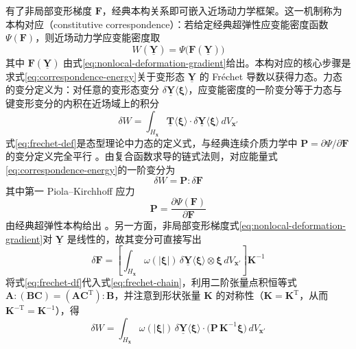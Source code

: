 有了非局部变形梯度 $\mathbf{F}$，经典本构关系即可嵌入近场动力学框架。这一机制称为本构对应（constitutive correspondence）：若给定经典超弹性应变能密度函数 $\Psi(\mathbf{F})$，则近场动力学应变能密度取
\begin{equation}
  W(\underline{\mathbf{Y}})=\Psi\bigl(\mathbf{F}(\underline{\mathbf{Y}})\bigr)
  \label{eq:correspondence-energy}
\end{equation}
其中 $\mathbf{F}(\underline{\mathbf{Y}})$ 由式\eqref{eq:nonlocal-deformation-gradient}给出。本构对应的核心步骤是求式\eqref{eq:correspondence-energy}关于变形态 $\underline{\mathbf{Y}}$ 的 Fréchet 导数以获得力态。力态的变分定义为：对任意的变形态变分 $\delta\underline{\mathbf{Y}}\langle\boldsymbol{\xi}\rangle$，应变能密度的一阶变分等于力态与键变形变分的内积在近场域上的积分
\begin{equation}
  \delta W=\int_{H_{\mathbf{x}}}\underline{\mathbf{T}}\langle\boldsymbol{\xi}\rangle\cdot\delta\underline{\mathbf{Y}}\langle\boldsymbol{\xi}\rangle\,dV_{\mathbf{x}'}
  \label{eq:frechet-def}
\end{equation}
式\eqref{eq:frechet-def}是态型理论中力态的定义式，与经典连续介质力学中 $\mathbf{P}=\partial\Psi/\partial\mathbf{F}$ 的变分定义完全平行 \cite{Silling2007}。由复合函数求导的链式法则，对应能量式\eqref{eq:correspondence-energy}的一阶变分为
\begin{equation}
  \delta W=\mathbf{P}:\delta\mathbf{F}
  \label{eq:frechet-chain}
\end{equation}
其中第一 Piola–Kirchhoff 应力
\begin{equation}
  \mathbf{P}=\frac{\partial\Psi(\mathbf{F})}{\partial\mathbf{F}}
  \label{eq:piola-stress}
\end{equation}
由经典超弹性本构给出 \cite{Silling2007}。另一方面，非局部变形梯度式\eqref{eq:nonlocal-deformation-gradient}对 $\underline{\mathbf{Y}}$ 是线性的，故其变分可直接写出
\begin{equation}
  \delta\mathbf{F}=\left[\int_{H_{\mathbf{x}}}\omega(|\boldsymbol{\xi}|)\,
  \delta\underline{\mathbf{Y}}\langle\boldsymbol{\xi}\rangle\otimes\boldsymbol{\xi}\,dV_{\mathbf{x}'}\right]\mathbf{K}^{-1}
  \label{eq:frechet-df}
\end{equation}
将式\eqref{eq:frechet-df}代入式\eqref{eq:frechet-chain}，利用二阶张量点积恒等式 $\mathbf{A}:(\mathbf{B}\mathbf{C})=(\mathbf{A}\mathbf{C}^{\mathrm{T}}):\mathbf{B}$，并注意到形状张量 $\mathbf{K}$ 的对称性（$\mathbf{K}=\mathbf{K}^{\mathrm{T}}$，从而 $\mathbf{K}^{-\mathrm{T}}=\mathbf{K}^{-1}$），得
\begin{equation}
  \delta W=\int_{H_{\mathbf{x}}}\omega(|\boldsymbol{\xi}|)\,
  \delta\underline{\mathbf{Y}}\langle\boldsymbol{\xi}\rangle\cdot\bigl(\mathbf{P}\,\mathbf{K}^{-1}\boldsymbol{\xi}\bigr)\,dV_{\mathbf{x}'}
  \label{eq:frechet-result}
\end{equation}
